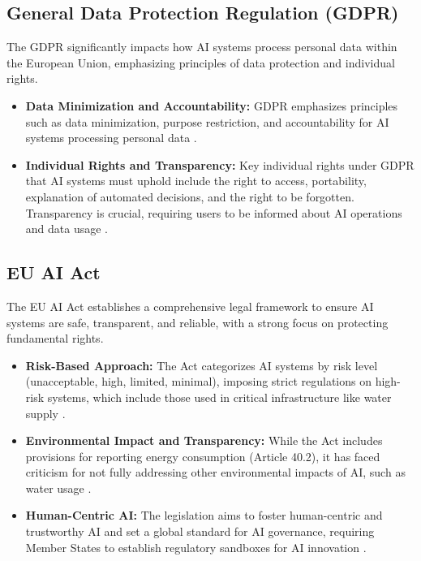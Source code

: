 \subsection{General Data Protection Regulation (GDPR)}
The GDPR significantly impacts how AI systems process personal data within the European Union, emphasizing principles of data protection and individual rights.
\begin{itemize}
    \item \textbf{Data Minimization and Accountability:} GDPR emphasizes principles such as data minimization, purpose restriction, and accountability for AI systems processing personal data \cite{Exabeam_GDPR, SecuritiAI_GDPR}.
    \item \textbf{Individual Rights and Transparency:} Key individual rights under GDPR that AI systems must uphold include the right to access, portability, explanation of automated decisions, and the right to be forgotten. Transparency is crucial, requiring users to be informed about AI operations and data usage \cite{Heuking_GDPR}.
\end{itemize}

\subsection{EU AI Act}
The EU AI Act establishes a comprehensive legal framework to ensure AI systems are safe, transparent, and reliable, with a strong focus on protecting fundamental rights.
\begin{itemize}
    \item \textbf{Risk-Based Approach:} The Act categorizes AI systems by risk level (unacceptable, high, limited, minimal), imposing strict regulations on high-risk systems, which include those used in critical infrastructure like water supply \cite{ArtificialIntelligenceAct_EU_AI_Act, Mondaq_EU_AI_Act}.
    \item \textbf{Environmental Impact and Transparency:} While the Act includes provisions for reporting energy consumption (Article 40.2), it has faced criticism for not fully addressing other environmental impacts of AI, such as water usage \cite{GreenSoftwareFoundation_EU_AI_Act, SmartWaterMagazine_EU_AI_Act}.
    \item \textbf{Human-Centric AI:} The legislation aims to foster human-centric and trustworthy AI and set a global standard for AI governance, requiring Member States to establish regulatory sandboxes for AI innovation \cite{Boell_EU_AI_Act}.
\end{itemize}

